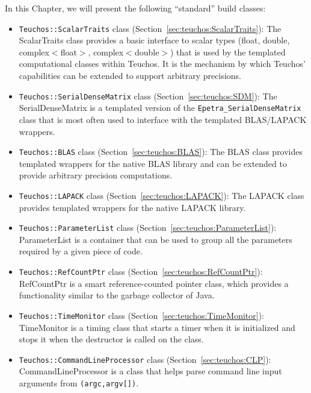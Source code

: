 In this Chapter, we will present the following ``standard'' build classes:
\begin{itemize}

\item \verb!Teuchos::ScalarTraits! class (Section~\ref{sec:teuchos:ScalarTraits}):
  The ScalarTraits class provides a basic interface to scalar types (float, double, 
  complex$<$float$>$, complex$<$double$>$) that is used by the templated computational
  classes within Teuchos.  It is the mechanism by which Teuchos' capabilities 
  can be extended to support arbitrary precisions.

\item \verb!Teuchos::SerialDenseMatrix! class (Section~\ref{sec:teuchos:SDM}): 
  The SerialDenseMatrix is a templated version of the \verb!Epetra_SerialDenseMatrix! class
  that is most often used to interface with the templated BLAS/LAPACK wrappers.

\item \verb!Teuchos::BLAS! class (Section~\ref{sec:teuchos:BLAS}):
  The BLAS class provides templated wrappers
  for the native BLAS library and can be extended to provide arbitrary precision
  computations.  

\item \verb!Teuchos::LAPACK! class (Section~\ref{sec:teuchos:LAPACK}):
  The LAPACK class provides templated wrappers for the native LAPACK library.

\item \verb!Teuchos::ParameterList! class (Section~\ref{sec:teuchos:ParameterList}):
  ParameterList is a container that can be used to group all the parameters required by a
  given piece of code.

\item \verb!Teuchos::RefCountPtr! class (Section~\ref{sec:teuchos:RefCountPtr}):
  RefCountPtr is a smart reference-counted pointer class, which provides a functionality
  similar to the garbage collector of Java. 

\item \verb!Teuchos::TimeMonitor! class (Section~\ref{sec:teuchos:TimeMonitor}):
  TimeMonitor is a timing class that starts a timer when it is initialized and
  stops it when the destructor is called on the class.

\item \verb!Teuchos::CommandLineProcessor! class (Section~\ref{sec:teuchos:CLP}): 
  CommandLineProcessor is a class that helps parse command line input arguments from 
  \verb!(argc,argv[])!.   
\end{itemize}


